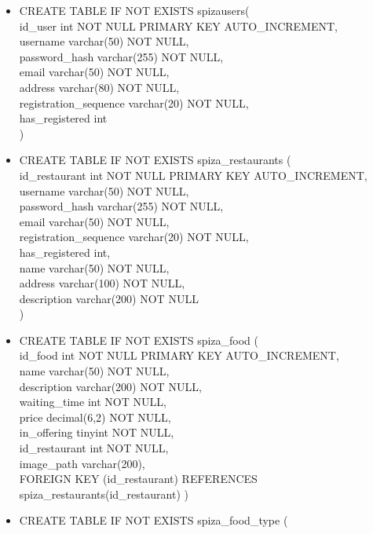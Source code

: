 \documentclass[12pt]{scrartcl}
\begin{document}
\begin{itemize}
 
    \item[] CREATE TABLE IF NOT EXISTS spiza\textunderscore users( \\
    id\_user int NOT NULL PRIMARY KEY AUTO\_INCREMENT,\\
    username varchar(50) NOT NULL,\\
    password\_hash varchar(255) NOT NULL,\\
    email varchar(50) NOT NULL,\\
    address varchar(80) NOT NULL,\\
    registration\_sequence varchar(20) NOT NULL,
    \\has\_registered int\\
    )
    \item[] CREATE TABLE IF NOT EXISTS spiza\_restaurants (\\
    id\_restaurant int NOT NULL PRIMARY KEY AUTO\_INCREMENT,\\
    username varchar(50) NOT NULL, \\
    password\_hash varchar(255) NOT NULL,\\
    email varchar(50) NOT NULL,\\
    registration\_sequence varchar(20) NOT NULL,\\
    has\_registered int,\\
    name varchar(50) NOT NULL,\\
    address varchar(100) NOT NULL,\\
    description varchar(200) NOT NULL\\
    )
    \item[] CREATE TABLE IF NOT EXISTS spiza\_food (\\
    id\_food int NOT NULL PRIMARY KEY AUTO\_INCREMENT,\\
    name varchar(50) NOT NULL,\\
    description varchar(200) NOT NULL,\\
    waiting\_time int NOT NULL,\\
    price decimal(6,2) NOT NULL,\\
    in\_offering tinyint NOT NULL,\\
    id\_restaurant int NOT NULL,\\
    image\_path varchar(200),\\
    FOREIGN KEY (id\_restaurant) REFERENCES spiza\_restaurants(id\_restaurant)
    )
    \item[] CREATE TABLE IF NOT EXISTS spiza\_food\_type (\\

\end{itemize}
\end{document}
